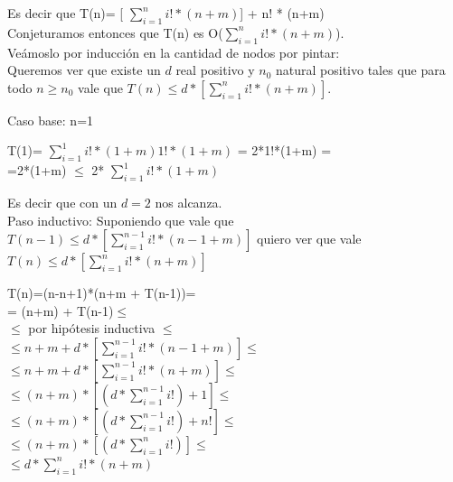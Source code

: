\indent Es decir que T(n)= [ $\sum_{i=1}^{n} i! * (n+m) $] + n! * (n+m)\\

\indent Conjeturamos entonces que T(n) es O($\sum_{i=1}^{n} i! * (n+m) $).\\

\indent Veámoslo por inducción en la cantidad de nodos por pintar:\\

\indent Queremos ver que existe un $d$ real positivo y $n_{0}$ natural positivo tales que para todo $n\geq n_{0}$ vale que $T(n) \leq d * [\sum_{i=1}^{n} i! * (n+m)] $.

\indent Caso base: n=1 \\

\begin{center}
T(1)= $\sum_{i=1}^{1} i! * (1+m)  1! * (1+m) $ = 2*1!*(1+m) =\\
=2*(1+m) $\leq$ 2*  $\sum_{i=1}^{1} i! * (1+m)$ \\
\end{center}

\indent Es decir que con un $d=2$ nos alcanza.\\


\indent Paso inductivo: Suponiendo que vale que $T(n-1) \leq d * [\sum_{i=1}^{n-1} i! * (n-1+m)] $ quiero ver que vale $T(n) \leq d * [\sum_{i=1}^{n} i! * (n+m)] $ \\


\begin{center}
T(n)=(n-n+1)*(n+m + T(n-1))=\\

= (n+m) + T(n-1)$\leq$\\

$\leq$ por hipótesis inductiva $\leq$\\

$\leq n+m + d * [\sum_{i=1}^{n-1} i! * (n-1+m)] \leq $\\

$\leq n+m + d * [\sum_{i=1}^{n-1} i! * (n+m)] \leq$ \\

$\leq (n+m) *[ (d* \sum_{i=1}^{n-1} i!) + 1] \leq$ \\

$\leq (n+m) *[ (d* \sum_{i=1}^{n-1} i!) + n!] \leq$ \\

$\leq (n+m) *[ (d* \sum_{i=1}^{n} i!)] \leq$\\

$\leq  d* \sum_{i=1}^{n} i!*(n+m)$\\

\end{center}


